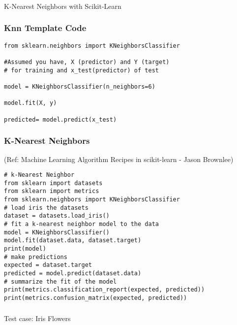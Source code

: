 \begin{frame}[fragile]\frametitle{}
\begin{center}
{\Large K-Nearest Neighbors with Scikit-Learn}
\end{center}
\end{frame}


\begin{frame}[fragile]\frametitle{Knn Template Code}
\begin{lstlisting}
from sklearn.neighbors import KNeighborsClassifier 

#Assumed you have, X (predictor) and Y (target) 
# for training and x_test(predictor) of test 

model = KNeighborsClassifier(n_neighbors=6)

model.fit(X, y) 

predicted= model.predict(x_test) 
\end{lstlisting}
\end{frame}

\begin{frame}[fragile]\frametitle{K-Nearest Neighbors}

{\tiny (Ref: Machine Learning Algorithm Recipes in scikit-learn - Jason Brownlee)}

\begin{lstlisting}
# k-Nearest Neighbor
from sklearn import datasets
from sklearn import metrics
from sklearn.neighbors import KNeighborsClassifier
# load iris the datasets
dataset = datasets.load_iris()
# fit a k-nearest neighbor model to the data
model = KNeighborsClassifier()
model.fit(dataset.data, dataset.target)
print(model)
# make predictions
expected = dataset.target
predicted = model.predict(dataset.data)
# summarize the fit of the model
print(metrics.classification_report(expected, predicted))
print(metrics.confusion_matrix(expected, predicted))
\end{lstlisting}



\end{frame}



\begin{frame}[fragile]\frametitle{}
\begin{center}
{\Large Test case: Iris Flowers}
\end{center}
\end{frame}



